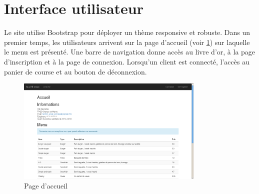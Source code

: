\section{Interface utilisateur}

Le site utilise Bootstrap pour déployer un thème responsive et robuste.
Dans un premier temps, les utilisateurs arrivent sur la page d'accueil (voir
\ref{fig:index}) sur laquelle le menu est présenté. Une barre de navigation
donne accès au livre d'or, à la page d'inscription et à la page de connexion.
Lorsqu'un client est connecté, l'accès au panier de course et au bouton de
déconnexion.

\begin{figure}[H]
	\centering
	\includegraphics[width=0.8\textwidth]{res/index.png}
	\caption{Page d'accueil}
	\label{fig:index}
\end{figure}
